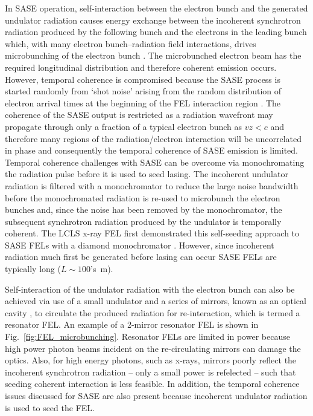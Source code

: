 \documentclass[../main.tex]{subfiles}
\begin{document}
In SASE operation, self-interaction between the electron bunch and the generated undulator radiation causes energy exchange between the incoherent synchrotron radiation produced by the following bunch and the electrons in the leading bunch which, with many electron bunch--radiation field interactions, drives microbunching of the electron bunch \cite{kondratenko1980generating,bonifacio1984collective}. The microbunched electron beam has the required longitudinal distribution and therefore coherent emission occurs. However, temporal coherence is compromised because the SASE process is started randomly from `shot noise' arising from the random distribution of
electron arrival times at the beginning of the FEL interaction region \cite{mcneil2003unified}. The coherence of the SASE output is restricted as a radiation wavefront may propagate through only a fraction of a typical electron bunch as $vz < c$ and therefore many regions of the radiation/electron interaction will be uncorrelated in phase \cite{thompson2010improved} and consequently the temporal coherence of SASE emission is limited. Temporal coherence challenges with SASE can be overcome via monochromating the radiation pulse before it is used to seed lasing. The incoherent undulator radiation is filtered with a monochromator to reduce the large noise bandwidth before the monochromated radiation is re-used to microbunch the electron bunches and, since the noise has been removed by the monochromator, the subsequent synchrotron radiation produced by the undulator is temporally coherent. The LCLS x-ray FEL first demonstrated this self-seeding approach to SASE FELs with a diamond monochromator \cite{emma2010first}. However, since incoherent radiation much first be generated before lasing can occur SASE FELs are typically long ($L\sim 100$'s~\si{\meter}).

Self-interaction of the undulator radiation with the electron bunch can also be achieved via use of a small undulator and a series of mirrors, known as an optical cavity \cite{petrillo2012photon}, to circulate the produced radiation for re-interaction, which is termed a resonator FEL. An example of a 2-mirror resonator FEL is shown in Fig.~\ref{fig:FEL_microbunching}. Resonator FELs are limited in power because high power photon beams incident on the re-circulating mirrors can damage the optics. Also, for high energy photons, such as x-rays, mirrors poorly reflect the incoherent synchrotron radiation -- only a small power is refelected -- such that seeding coherent interaction is less feasible. In addition, the temporal coherence issues discussed for SASE are also present because incoherent undulator radiation is used to seed the FEL.
\end{document}
